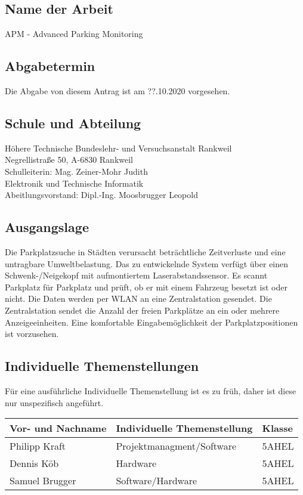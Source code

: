\subsection{Name der Arbeit}
APM - Advanced Parking Monitoring

\subsection{Abgabetermin}
Die Abgabe von diesem Antrag ist am ??.10.2020 vorgesehen.

\subsection{Schule und Abteilung}
Höhere Technische Bundeslehr- und Versuchsanstalt Rankweil\\
Negrellistraße 50, A-6830 Rankweil\\
Schulleiterin: Mag. Zeiner-Mohr Judith\\

Elektronik und Technische Informatik\\
Abeitlungsvorstand: Dipl.-Ing. Moosbrugger Leopold

\subsection{Ausgangslage}
Die Parkplatzsuche in Städten verursacht beträchtliche Zeitverluste und eine untragbare Umweltbelastung. Das zu entwickelnde System verfügt über einen Schwenk-/Neigekopf mit aufmontiertem Laserabstandssensor. Es scannt Parkplatz für Parkplatz und prüft, ob er mit einem Fahrzeug besetzt ist oder nicht. Die Daten werden per WLAN an eine Zentralstation gesendet. Die Zentralstation sendet die Anzahl der freien Parkplätze an ein oder mehrere Anzeigeeinheiten. Eine komfortable Eingabemöglichkeit der Parkplatzpositionen ist vorzusehen.

\subsection{Individuelle Themenstellungen}
Für eine ausführliche Individuelle Themenstellung ist es zu früh, daher ist diese nur unspezifisch angeführt.

\begin{table}[htb]
  \begin{tabular}{|l|l|l|}
    \hline
    \textbf{Vor- und Nachname} & \textbf{Individuelle Themenstellung} & \textbf{Klasse} \\ \hline
    Philipp Kraft              & Projektmanagment/Software            & 5AHEL           \\ \hline
    Dennis Köb                 & Hardware                             & 5AHEL           \\ \hline
    Samuel Brugger             & Software/Hardware                    & 5AHEL           \\ \hline
  \end{tabular}
\end{table}

